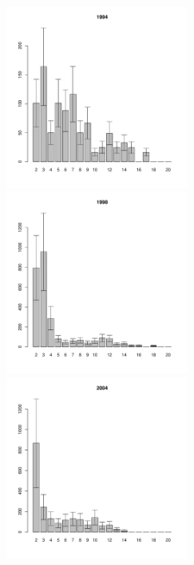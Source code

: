 \begin{figure}[hp]
	\begin{minipage}[b]{.3\linewidth}
	\begin{center}
	\includegraphics[width=60mm]{../White_Sea/Luvenga_II_razrez/fucus_zone2_1994_.pdf}
	\end{center}
	\end{minipage}
	\hfill
	\begin{minipage}[b]{.3\linewidth}
	\begin{center}
	\includegraphics[width=60mm]{../White_Sea/Luvenga_II_razrez/fucus_zone2_1998_.pdf}
	\end{center}
	\end{minipage}	
	\hfill
	\begin{minipage}[b]{.3\linewidth}
	\begin{center}
	\includegraphics[width=60mm]{../White_Sea/Luvenga_II_razrez/fucus_zone2_2004_.pdf}
	\end{center}
	\end{minipage}


\end{figure}
